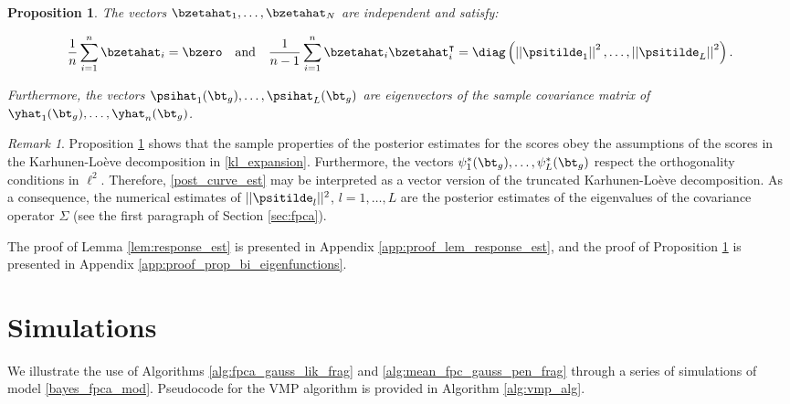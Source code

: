 \documentclass[12pt]{article}
\theoremstyle{plain}
\newtheorem{proposition}[theorem]{Proposition}
\theoremstyle{definition}
\theoremstyle{remark}
\newtheorem*{remark}{Remark}
\begin{document}
\begin{proposition}
	
	The vectors $\bzetahat_1, \dots, \bzetahat_N$ are independent and satisfy:
	
	\[
		\frac{1}{n} \sum_{i=1}^n \bzetahat_i = \bzero \quad
		\text{and} \quad
		\frac{1}{n-1} \sum_{i=1}^n \bzetahat_i \bzetahat^{\intercal}_i = \diag \left(
			\left|\left| \psitilde_1 \right|\right|^2, \dots, \left|\left| \psitilde_L \right|\right|^2
		\right).
	\]
	
	\noindent Furthermore, the vectors $\psihat_1 (\bt_g), \dots, \psihat_L (\bt_g)$ are eigenvectors of the sample
	covariance matrix of $\yhat_1 (\bt_g), \dots, \yhat_n (\bt_g)$.
	
\label{prop:bi_orthogonal}
\end{proposition}

\begin{remark}
	
	Proposition \ref{prop:bi_orthogonal} shows that the sample properties of the posterior estimates for the scores
	obey the assumptions of the scores in the Karhunen-Lo\`{e}ve decomposition in \eqref{kl_expansion}.
	Furthermore, the vectors $\psi^*_1 (\bt_g), \dots, \psi^*_L (\bt_g)$ respect the orthogonality conditions in $\ell^2$.
	Therefore, \eqref{post_curve_est} may be interpreted as a vector version of the truncated
	Karhunen-Lo\`{e}ve decomposition. As a consequence, the numerical estimates of
	$|| \psitilde_l ||^2$, $l = 1, \dots, L$ are the posterior estimates of the eigenvalues of the covariance operator
	$\Sigma$ (see the first paragraph of Section \ref{sec:fpca}).
	
\end{remark}

\noindent The proof of Lemma \ref{lem:response_est} is presented in Appendix \ref{app:proof_lem_response_est},
and the proof of Proposition \ref{prop:bi_orthogonal} is presented in Appendix \ref{app:proof_prop_bi_eigenfunctions}.


\section{Simulations}
\label{sec:sims}

We illustrate the use of Algorithms \ref{alg:fpca_gauss_lik_frag} and \ref{alg:mean_fpc_gauss_pen_frag}
through a series of simulations of model \eqref{bayes_fpca_mod}. Pseudocode for the VMP algorithm is
provided in Algorithm \ref{alg:vmp_alg}.
\end{document}

